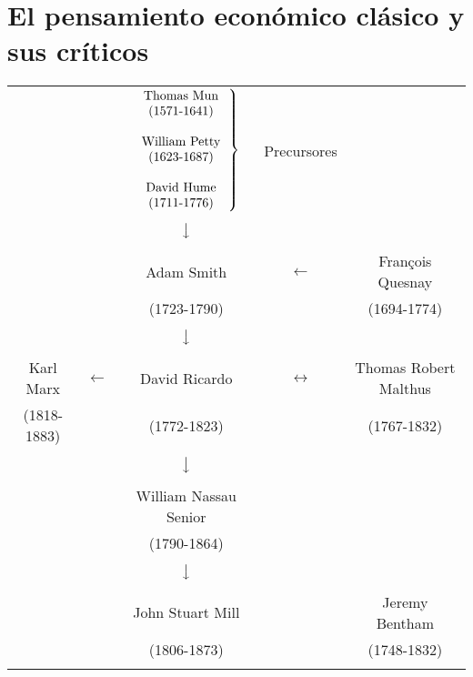 \documentclass[10pt]{book}
\begin{document}
 
\part{El pensamiento económico clásico y sus críticos}

\begin{tcolorbox}[colback=black!3!white,colframe=black!80!white,title=Influencia en el pensamiento económico clásico]	
    \begin{center}
	\vspace{.3cm}
	\begin{tabular}{ccccc}
	    &&
	    $\left.
	    \begin{tabular}{c}
		Thomas Mun\\
		(1571-1641)\\\\
		William Petty\\
		(1623-1687)\\\\
		David Hume\\
		(1711-1776)
	    \end{tabular}
	    \right\}$
	    &\small Precursores&\\\\
	&&$\big\downarrow$&&\\\\
	&&Adam Smith&$\longleftarrow$&François Quesnay\\
	&&(1723-1790)&&(1694-1774)\\\\
	&&$\big\downarrow$&&\\\\
	Karl Marx&$\longleftarrow$&David Ricardo&$\longleftrightarrow$&Thomas Robert Malthus\\
	    (1818-1883)&&(1772-1823)&&(1767-1832)\\\\
	&&$\big\downarrow$&&\\\\
		       &&William Nassau Senior&&\\
		       &&(1790-1864)&&\\\\
	&&$\big\downarrow$&&\\\\
		       &&John Stuart Mill&\longleftarrow&Jeremy Bentham\\
		       &&(1806-1873)&&(1748-1832)\\\\
	\end{tabular}
    \end{center}
\end{tcolorbox}
\end{document}
